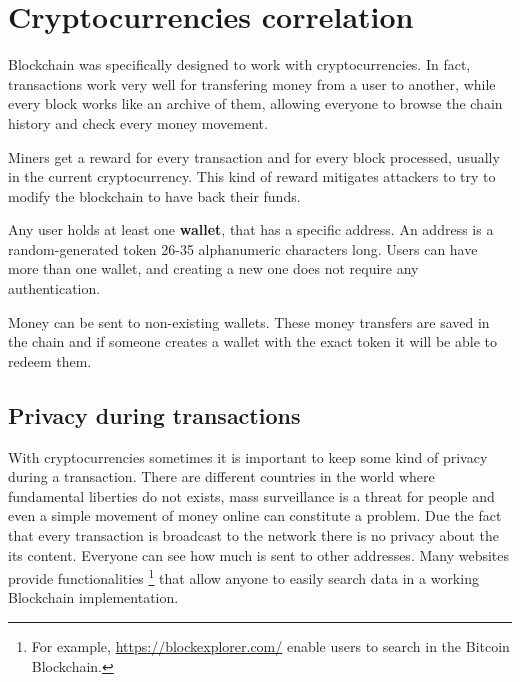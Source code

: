 \section{Cryptocurrencies correlation}
\label{sec:crypto_corr}

Blockchain was specifically designed to work with cryptocurrencies. In fact,
transactions work very well for transfering money from a user to another, while
every block works like an archive of them, allowing everyone to browse
the chain history and check every money movement.

Miners get a reward for every transaction and for every block processed,
usually in the current cryptocurrency. This kind of reward mitigates attackers
to try to modify the blockchain to have back their funds.

Any user holds at least one \textbf{wallet}, that has a specific address. An
address is a random-generated token 26-35 alphanumeric characters long. Users
can have more than one wallet, and creating a new one does not require any
authentication.

Money can be sent to non-existing wallets. These money transfers are saved in
the chain and if someone creates a wallet with the exact token it will be able
to redeem them.

\subsection{Privacy during transactions}

With cryptocurrencies sometimes it is important to keep some kind of privacy
during a transaction. There are different countries in the world where
fundamental liberties do not exists, mass surveillance is a threat for
people and even a simple movement of money online can constitute a problem.
Due the fact that every transaction is broadcast to the network there is no
privacy about the its content. Everyone can see how much is sent to
other addresses. Many websites provide functionalities \footnote{For example,
\url{https://blockexplorer.com/} enable users to search in the Bitcoin
Blockchain.} that allow anyone to easily search data in a working Blockchain
implementation.

